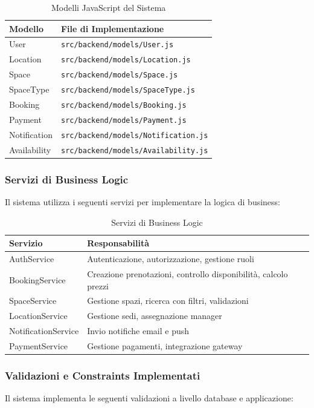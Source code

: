 \begin{table}[H]
\centering
\begin{tabular}{@{}ll@{}}
\toprule
\textbf{Modello} & \textbf{File di Implementazione} \\
\midrule
User & \texttt{src/backend/models/User.js} \\
Location & \texttt{src/backend/models/Location.js} \\
Space & \texttt{src/backend/models/Space.js} \\
SpaceType & \texttt{src/backend/models/SpaceType.js} \\
Booking & \texttt{src/backend/models/Booking.js} \\
Payment & \texttt{src/backend/models/Payment.js} \\
Notification & \texttt{src/backend/models/Notification.js} \\
Availability & \texttt{src/backend/models/Availability.js} \\
\bottomrule
\end{tabular}
\caption{Modelli JavaScript del Sistema}
\end{table}

\subsubsection{Servizi di Business Logic}
Il sistema utilizza i seguenti servizi per implementare la logica di business:

\begin{table}[H]
\centering
\begin{tabular}{@{}lp{8cm}@{}}
\toprule
\textbf{Servizio} & \textbf{Responsabilità} \\
\midrule
AuthService & Autenticazione, autorizzazione, gestione ruoli \\
BookingService & Creazione prenotazioni, controllo disponibilità, calcolo prezzi \\
SpaceService & Gestione spazi, ricerca con filtri, validazioni \\
LocationService & Gestione sedi, assegnazione manager \\
NotificationService & Invio notifiche email e push \\
PaymentService & Gestione pagamenti, integrazione gateway \\
\bottomrule
\end{tabular}
\caption{Servizi di Business Logic}
\end{table}

\subsubsection{Validazioni e Constraints Implementati}
Il sistema implementa le seguenti validazioni a livello database e applicazione:

